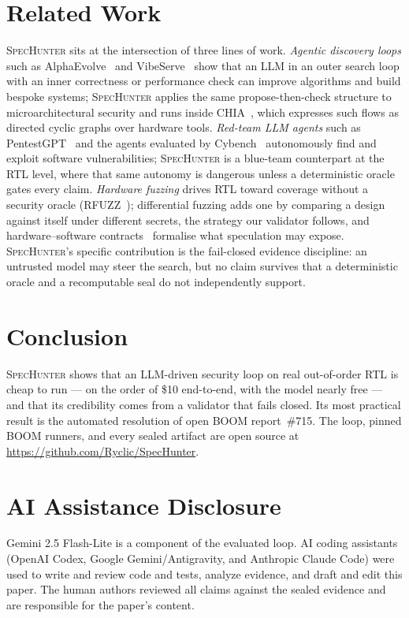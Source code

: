 \documentclass[conference,10pt]{IEEEtran}
\newcommand{\sh}{\textsc{SpecHunter}}
\begin{document}
\section{Related Work}\label{sec:related}
\sh{} sits at the intersection of three lines of work. \emph{Agentic discovery
loops} such as AlphaEvolve~\cite{alphaevolve} and VibeServe~\cite{vibeserve} show
that an LLM in an outer search loop with an inner correctness or performance check
can improve algorithms and build bespoke systems; \sh{} applies the same
propose-then-check structure to microarchitectural security and runs inside
CHIA~\cite{chia}, which expresses such flows as directed cyclic graphs over
hardware tools. \emph{Red-team LLM agents} such as PentestGPT~\cite{pentestgpt}
and the agents evaluated by Cybench~\cite{cybench} autonomously find and exploit
software vulnerabilities; \sh{} is a blue-team counterpart at the RTL level, where
that same autonomy is dangerous unless a deterministic oracle gates every claim.
\emph{Hardware fuzzing} drives RTL toward coverage without a security oracle
(RFUZZ~\cite{rfuzz}); differential fuzzing adds one by comparing a design against
itself under different secrets, the strategy our validator follows, and
hardware--software contracts~\cite{contracts} formalise what speculation may
expose. \sh{}'s specific contribution is the fail-closed evidence discipline: an
untrusted model may steer the search, but no claim survives that a deterministic
oracle and a recomputable seal do not independently support.

\section{Conclusion}
\sh{} shows that an LLM-driven security loop on real out-of-order RTL is cheap to
run --- on the order of \$10 end-to-end, with the model nearly free --- and that
its credibility comes from a validator that fails closed. Its most practical
result is the automated resolution of open BOOM report~\#715. The loop, pinned
BOOM runners, and every sealed artifact are open source at
\url{https://github.com/Ryclic/SpecHunter}.

\section*{AI Assistance Disclosure}
Gemini 2.5 Flash-Lite is a component of the evaluated loop. AI coding
assistants (OpenAI Codex, Google Gemini/Antigravity, and Anthropic Claude Code)
were used to write and review code and tests, analyze evidence, and draft and
edit this paper. The human authors reviewed all claims against the sealed
evidence and are responsible for the paper's content.
\end{document}
